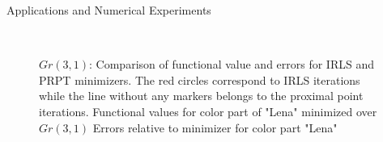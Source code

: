 \begin{chapter}{Applications and Numerical Experiments}
\begin{figure}[h!]
    \centering
    \\
    \caption[Comparison IRLS \& PRPT for $Gr(3,1)$]{$Gr(3,1)$: Comparison of functional value and errors for IRLS and PRPT minimizers.
	The red circles correspond to IRLS iterations while the line without any markers belongs to the proximal point iterations.
	 Functional values for color part of "Lena" minimized over $Gr(3,1)$ 
	 Errors relative to minimizer for color part "Lena"
	\label{fig:comparison_gr31}
    }
\end{figure}





\FloatBarrier

\end{chapter}
